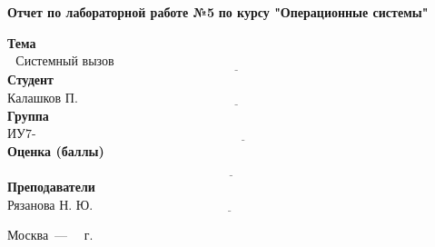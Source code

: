 \begin{titlepage}
	\begin{center}
		\Large\textbf{  Отчет по лабораторной работе №5 }
		\textbf{по курсу "Операционные системы"}
	\end{center}

\noindent\textbf{Тема} $\underline{\text{~~Системный вызов open~~~~~~~~~~~~~~~~~~~~~~~~~~~~~~~~~~~~~~~~~~~~~~~~~~~~~~~~~~~~~~~~~~~~~~~~~~~~~~~~~~~~~~~~~}}$\newline\newline
\noindent\textbf{Студент} $\underline{\text{Калашков П. А.~~~~~~~~~~~~~~~~~~~~~~~~~~~~~~~~~~~~~~~~~~~~~~~~~~~~~~~~~~~~~~~~~~~~~~~~~~~~~~~~~~~~~~~~~~~~~~~}}$\newline\newline
\noindent\textbf{Группа} $\underline{\text{ИУ7-66Б~~~~~~~~~~~~~~~~~~~~~~~~~~~~~~~~~~~~~~~~~~~~~~~~~~~~~~~~~~~~~~~~~~~~~~~~~~~~~~~~~~~~~~~~~~~~~~~~~~~~~~~~~~~}}$\newline\newline
\noindent\textbf{Оценка (баллы)} $\underline{\text{~~~~~~~~~~~~~~~~~~~~~~~~~~~~~~~~~~~~~~~~~~~~~~~~~~~~~~~~~~~~~~~~~~~~~~~~~~~~~~~~~~~~~~~~~~~~~~~~~~~~~~~~~~}}$\newline\newline
\noindent\textbf{Преподаватели} $\underline{\text{Рязанова Н. Ю.~~~~~~~~~~~~~~~~~~~~~~~~~~~~~~~~~~~~~~~~~~~~~~~~~~~~~~~~~~~~~~~~~~~~~~~~~~~~~~~~~~~~~}}$\newline\newline\newline


	\begin{center}
		\vfill
		Москва~---~\the\year
		~г.
	\end{center}
	\restoregeometry
\end{titlepage}

